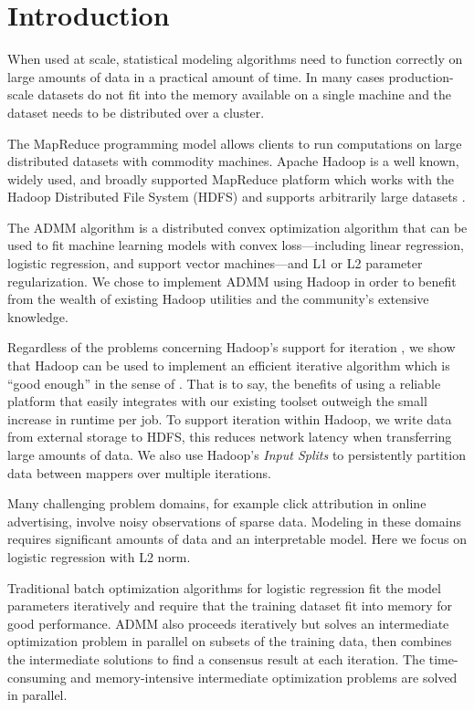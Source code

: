 \documentclass[10pt, conference, compsocconf]{IEEEtran}
\begin{document}
\section{Introduction}
When used at scale, statistical modeling algorithms need to function correctly on large amounts of data in a practical amount of time.  In many cases production-scale datasets do not fit into the memory available on a single machine and the dataset needs to be distributed over a cluster.

The MapReduce programming model \cite{dean2004} allows clients to run computations on large distributed datasets with commodity machines.  Apache Hadoop is a well known, widely used, and broadly supported MapReduce platform which works with the Hadoop Distributed File System (HDFS)  and supports arbitrarily large datasets \cite{white2009}.

The ADMM algorithm \cite{boyd} is a distributed convex optimization algorithm that can be used to fit machine learning models with convex loss---including linear regression, logistic regression, and support vector machines---and L1 or L2 parameter regularization.  We chose to implement ADMM using Hadoop in order to benefit from the wealth of existing Hadoop utilities and the community's extensive knowledge.

Regardless of the problems concerning Hadoop's support for iteration \cite{bu2010}, we show that Hadoop can be used to implement an efficient iterative algorithm which is ``good enough'' in the sense of \cite{lin2012}.  That is to say, the benefits of using a reliable platform that easily integrates with our existing toolset outweigh the small increase in runtime per job.  To support iteration within Hadoop, we write data from external storage to HDFS, this reduces network latency when transferring large amounts of data.  We also use Hadoop's \emph{Input Splits} to persistently partition data between mappers over multiple iterations.

Many challenging problem domains, for example click attribution in online advertising, involve noisy observations of sparse data.  Modeling in these domains requires significant amounts of data and an interpretable model.  Here we focus on logistic regression with L2 norm.

Traditional batch optimization algorithms for logistic regression fit the model parameters iteratively and require that the training dataset fit into memory for good performance. ADMM also proceeds iteratively but solves an intermediate optimization problem in parallel on subsets of the training data, then combines the intermediate solutions to find a consensus result at each iteration. The time-consuming and memory-intensive intermediate optimization problems are solved in parallel.
\end{document}
